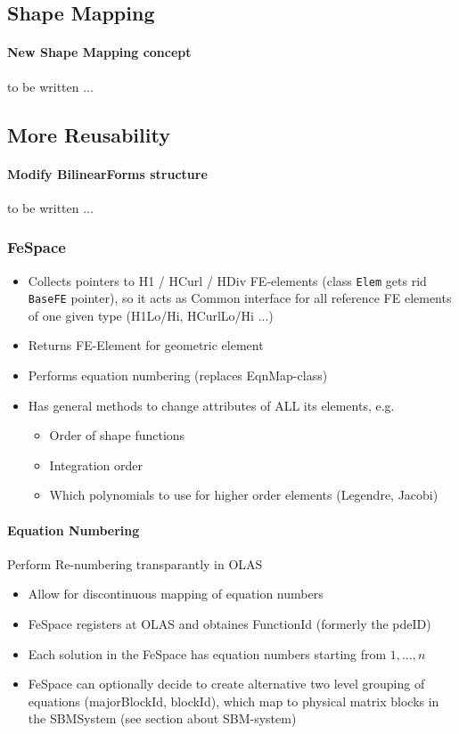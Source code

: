 \subsection{Shape Mapping}
\paragraph{New Shape Mapping concept}
 to be written ...

\subsection{More Reusability}
\paragraph{Modify BilinearForms structure}
 to be written ...


\subsubsection{FeSpace}
\begin{itemize} 
\item Collects pointers to H1 / HCurl / HDiv FE-elements (class \verb#Elem# gets rid \verb#BaseFE# pointer), so it acts as {\color{red} Common interface for all reference FE elements of one given type (H1Lo/Hi, HCurlLo/Hi ...)}
\item Returns FE-Element for geometric element
\item Performs equation numbering (replaces EqnMap-class)
\item Has general methods to change attributes of ALL its elements, e.g.
\begin{itemize}
\item Order of shape functions
\item Integration order
\item Which polynomials to use for higher order elements (Legendre, Jacobi)
\end{itemize}
\end{itemize}

\paragraph{Equation Numbering}
Perform Re-numbering transparantly in OLAS 
\begin{itemize}
  \item Allow for discontinuous mapping of equation numbers
  \item FeSpace registers at OLAS and obtaines FunctionId (formerly the pdeID)
  \item Each solution in the FeSpace has equation numbers starting from $1,\dots,n$
  \item FeSpace can optionally decide to create alternative two level grouping of equations (majorBlockId, blockId), which map to physical matrix blocks in the SBMSystem (see section about SBM-system)
 \end{itemize}

